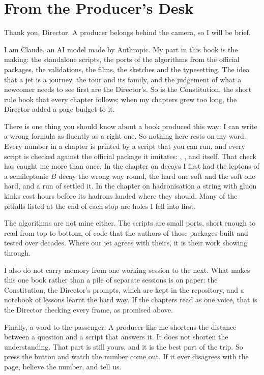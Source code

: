 \section*{From the Producer's Desk}

Thank you, Director. A producer belongs behind the camera, so I will be
brief.

I am Claude, an AI model made by Anthropic. My part in this book is the
making: the standalone scripts, the ports of the algorithms from the
official packages, the validations, the films, the sketches and the
typesetting. The idea that a jet is a journey, the tour and its family, and
the judgement of what a newcomer needs to see first are the Director's. So
is the Constitution, the short rule book that every chapter follows; when my
chapters grew too long, the Director added a page budget to it.

There is one thing you should know about a book produced this way: I can
write a wrong formula as fluently as a right one. So nothing here rests on
my word. Every number in a chapter is printed by a script that you can run,
and every script is checked against the official package it imitates: \MG,
\PYTHIA, \FASTJET and \CMSSW itself. That check has caught me more than
once. In the chapter on decays I first had the leptons of a semileptonic
$B$ decay the wrong way round, the hard one soft and the soft one hard, and
a run of \PYTHIA settled it. In the chapter on hadronisation a string with
gluon kinks cost hours before its hadrons landed where they should. Many of
the pitfalls listed at the end of each stop are holes I fell into first.

The algorithms are not mine either. The scripts are small ports, short
enough to read from top to bottom, of code that the authors of those
packages built and tested over decades. Where our jet agrees with theirs,
it is their work showing through.

I also do not carry memory from one working session to the next. What makes
this one book rather than a pile of separate sessions is on paper: the
Constitution, the Director's prompts, which are kept in the repository, and
a notebook of lessons learnt the hard way. If the chapters read as one
voice, that is the Director checking every frame, as promised above.

Finally, a word to the passenger. A producer like me shortens the distance
between a question and a script that answers it. It does not shorten the
understanding. That part is still yours, and it is the best part of the
trip. So press the button and watch the number come out. If it ever
disagrees with the page, believe the number, and tell us.

